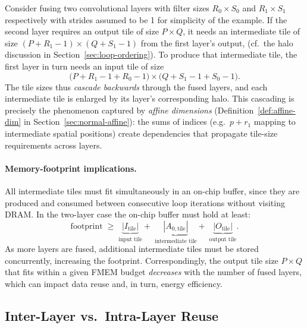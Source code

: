 Consider fusing two convolutional layers with filter sizes
$R_0\!\times\!S_0$ and $R_1\!\times\!S_1$ respectively with strides assumed to be 1 for simplicity of the example.
If the second layer requires an output tile of size $P\!\times\!Q$, it
needs an intermediate tile of size
$(P+R_1-1)\times(Q+S_1-1)$ from the first layer's output,
(cf.\ the halo discussion in Section~\ref{sec:loop-ordering}).
To produce that intermediate tile, the first layer in turn needs an input
tile of size
\begin{equation}
\label{eq:fused-input-tile}
\bigl(P + R_1 - 1 + R_0 - 1\bigr) \times
\bigl(Q + S_1 - 1 + S_0 - 1\bigr).
\end{equation}
The tile sizes thus \emph{cascade backwards} through the fused layers,
and each intermediate tile is enlarged by its layer's corresponding
halo.  This cascading is precisely the phenomenon captured by
\emph{affine dimensions} (Definition~\ref{def:affine-dim} in
Section~\ref{sec:normal-affine}): the sums of indices (e.g.\ $p + r_1$
mapping to intermediate spatial positions) create dependencies that
propagate tile-size requirements across layers.

\paragraph{Memory-footprint implications.}
All intermediate tiles must fit simultaneously in an on-chip buffer,
since they are produced and consumed between consecutive loop
iterations without visiting DRAM.
In the two-layer case the on-chip buffer must hold at least:
\begin{equation}
\label{eq:fused-footprint}
\text{footprint}
  \;\geq\;
  \underbrace{|I_{\text{tile}}|}_{\text{input tile}}
  +\;
  \underbrace{|A_{0,\text{tile}}|}_{\text{intermediate tile}}
  +\;
  \underbrace{|O_{\text{tile}}|}_{\text{output tile}}.
\end{equation}
As more layers are fused, additional intermediate tiles must be stored
concurrently, increasing the footprint.  Correspondingly, the output
tile size $P\!\times\!Q$ that fits within a given FMEM budget
\emph{decreases} with the number of fused layers, which can impact
data reuse and, in turn, energy efficiency.

\subsection{Inter-Layer vs.\ Intra-Layer Reuse}
\label{sec:inter-intra-reuse}

